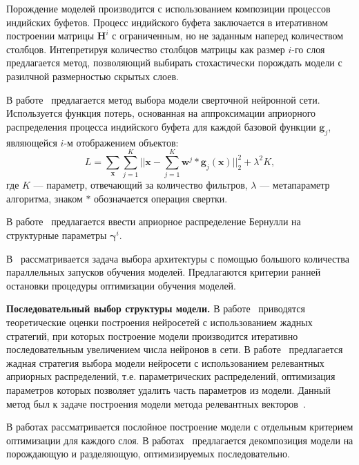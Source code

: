 Порождение моделей производится с использованием композиции процессов индийских буфетов. Процесс индийского буфета заключается в итеративном построении матрицы $\mathbf{H}^i$ с ограниченным, но не заданным наперед количеством столбцов. Интепретируя количество столбцов  матрицы как размер $i$-го слоя предлагается метод, позволяющий выбирать стохастически порождать модели с разилчной размерностью скрытых слоев. 

В работе~\cite{cib_simple} предлагается метод выбора модели сверточной нейронной сети. Используется функция потерь, основанная на аппроксимации априорного распределения процесса индийского буфета для каждой базовой функции $\mathbf{g}_j$, являющейся $i$-м отображением объектов:
\[
    L = \sum_{\mathbf{x}}\sum_{j=1}^K ||\mathbf{x} - \sum_{j=1}^K \mathbf{w}^j * \mathbf{g}_j(\mathbf{x})||_2^2 + \lambda^2K,
\]
где $K$ --- параметр, отвечающий за количество фильтров, $\lambda$ --- метапараметр алгоритма, знаком $*$ обозначается операция свертки.

В работе~\cite{shirakawa2018dynamic} предлагается ввести априорное распределение Бернулли на структурные параметры $\boldsymbol{\gamma}^i$.

В~\cite{optimal_racing} рассматривается задача выбора архитектуры с помощью большого количества параллельных запусков обучения моделей. Предлагаются критерии ранней остановки процедуры оптимизации обучения моделей.

\par{\textbf{Последовательный выбор структуры модели. }}
В работе~\cite{greed} приводятся теоретические оценки построения нейросетей с использованием жадных стратегий,  при которых построение модели производится итеративно последовательным увеличением числа нейронов в сети. В работе~\cite{greed_mlp} предлагается жадная стратегия выбора модели нейросети с использованием релевантных априорных распределений, т.е. параметрических распределений, оптимизация параметров которых позволяет удалить часть параметров из модели. Данный метод был к задаче построения модели метода релевантных векторов~\cite{rvm}. 

В работах\cite{Bengio, hd} рассматривается послойное построение модели с отдельным критерием оптимизации для каждого слоя. В работах~\cite{Kingma, gendis_pictures, gendis_phd} предлагается декомпозиция модели на порождающую и разделяющую, оптимизируемых последовательно. 

